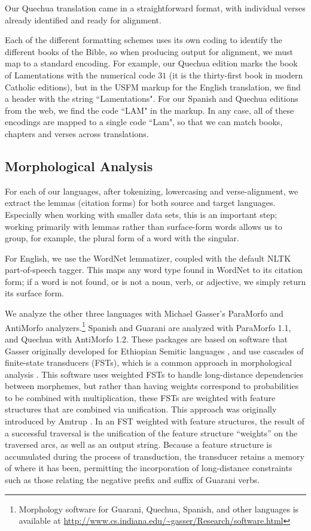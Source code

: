 Our Quechua translation came in a straightforward format, with individual
verses already identified and ready for alignment.

Each of the different formatting schemes uses its own coding to identify the
different books of the Bible, so when producing output for alignment, we must
map to a standard encoding. For example, our Quechua edition marks the book of
Lamentations with the numerical code $31$ (it is the thirty-first book in
modern Catholic editions), but in the USFM markup for the English translation,
we find a header with the string ``Lamentations". For our Spanish and Quechua
editions from the web, we find the code ``LAM" in the markup. In any case, all
of these encodings are mapped to a single code ``Lam", so that we can match
books, chapters and verses across translations.

\subsection{Morphological Analysis}
\label{sec:guaranima}

For each of our languages, after tokenizing, lowercasing and verse-alignment,
we extract the lemmas (citation forms) for both source and target languages.
Especially when working with smaller data sets, this is an important step;
working primarily with lemmas rather than surface-form words allows us to
group, for example, the plural form of a word with the singular.

For English, we use the WordNet lemmatizer, coupled with the default NLTK
part-of-speech tagger. This maps any word type found in WordNet to its citation
form; if a word is not found, or is not a noun, verb, or adjective, we simply
return its surface form.

We analyze the other three languages with Michael Gasser's ParaMorfo and
AntiMorfo analyzers.\footnote{Morphology software for Guarani, Quechua,
Spanish, and other languages is available at
\url{http://www.cs.indiana.edu/~gasser/Research/software.html}} Spanish and
Guarani are analyzed with ParaMorfo 1.1, and Quechua with AntiMorfo 1.2. These
packages are based on software that Gasser originally developed for Ethiopian
Semitic languages \cite{gasser:eacl09}, and use cascades of finite-state
transducers (FSTs), which is a common approach in morphological analysis
\cite{beesley+karttunen}. This software uses weighted FSTs to handle
long-distance dependencies between morphemes, but rather than having weights
correspond to probabilities to be combined with multiplication, these FSTs are
weighted with feature structures that are combined via unification.  This
approach was originally introduced by Amtrup \cite{amtrup:03}. In an FST
weighted with feature structures, the result of a successful traversal is the
unification of the feature structure ``weights'' on the traversed arcs, as well
as an output string. Because a feature structure is accumulated during the
process of transduction, the transducer retains a memory of where it has been,
permitting the incorporation of long-distance constraints such as those
relating the negative prefix and suffix of Guarani verbs.

